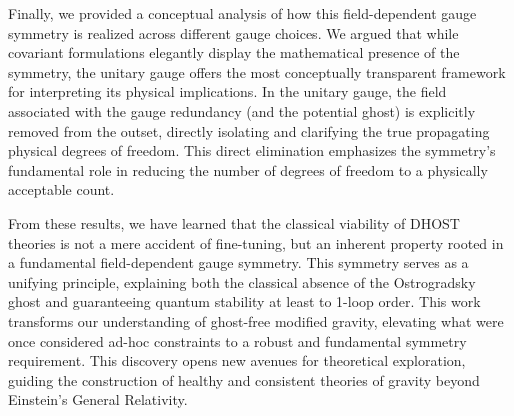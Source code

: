 \documentclass[twocolumn]{aastex631}
\begin{document}
Finally, we provided a conceptual analysis of how this field-dependent gauge symmetry is realized across different gauge choices. We argued that while covariant formulations elegantly display the mathematical presence of the symmetry, the unitary gauge offers the most conceptually transparent framework for interpreting its physical implications. In the unitary gauge, the field associated with the gauge redundancy (and the potential ghost) is explicitly removed from the outset, directly isolating and clarifying the true propagating physical degrees of freedom. This direct elimination emphasizes the symmetry's fundamental role in reducing the number of degrees of freedom to a physically acceptable count.

From these results, we have learned that the classical viability of DHOST theories is not a mere accident of fine-tuning, but an inherent property rooted in a fundamental field-dependent gauge symmetry. This symmetry serves as a unifying principle, explaining both the classical absence of the Ostrogradsky ghost and guaranteeing quantum stability at least to 1-loop order. This work transforms our understanding of ghost-free modified gravity, elevating what were once considered ad-hoc constraints to a robust and fundamental symmetry requirement. This discovery opens new avenues for theoretical exploration, guiding the construction of healthy and consistent theories of gravity beyond Einstein's General Relativity.
\end{document}
